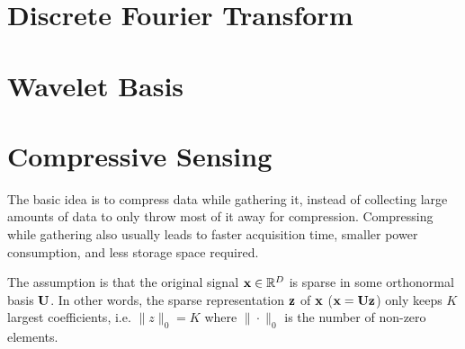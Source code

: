 \section{Discrete Fourier Transform}

\section{Wavelet Basis}

\section{Compressive Sensing}
The basic idea is to compress data while gathering it, instead of collecting large amounts of data to only throw most of it away for compression. Compressing while gathering also usually leads to faster acquisition time, smaller power consumption, and less storage space required.

The assumption is that the original signal \(\boldsymbol{\mathrm{x}} \in \mathbb{R}^D\) is sparse in some orthonormal basis \(\boldsymbol{\mathrm{U}}\). In other words, the sparse representation \(\boldsymbol{\mathrm{z}}\) of \(\boldsymbol{\mathrm{x}}\) (\(\boldsymbol{\mathrm{x}} = \boldsymbol{\mathrm{Uz}}\)) only keeps \(K\) largest coefficients, i.e. \(\| z \|_0 = K\) where \(\| \cdot \|_0\) is the number of non-zero elements.


